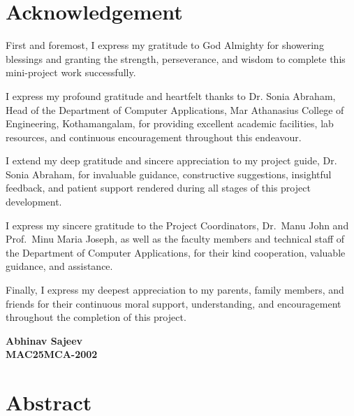 \documentclass[12pt,a4paper]{report}
\renewcommand{\headrulewidth}{0.4pt}
\renewcommand{\footrulewidth}{0.4pt}
\renewcommand{\headrulewidth}{0.4pt}
\renewcommand{\footrulewidth}{0.4pt}
\begin{document}
\pagestyle{fancy}
\fancyhf{}
\fancyfoot[C]{\thepage}
\renewcommand{\headrulewidth}{0pt}
\renewcommand{\footrulewidth}{0pt}

\fancypagestyle{plain}{
    \fancyhf{}
    \fancyfoot[C]{\thepage}
    \renewcommand{\headrulewidth}{0pt}
    \renewcommand{\footrulewidth}{0pt}
}

\chapter*{Acknowledgement}

First and foremost, I express my gratitude to God Almighty for showering blessings and granting the strength, perseverance, and wisdom to complete this mini-project work successfully.

I express my profound gratitude and heartfelt thanks to Dr. Sonia Abraham, Head of the Department of Computer Applications, Mar Athanasius College of Engineering, Kothamangalam, for providing excellent academic facilities, lab resources, and continuous encouragement throughout this endeavour.

I extend my deep gratitude and sincere appreciation to my project guide, Dr. Sonia Abraham, for invaluable guidance, constructive suggestions, insightful feedback, and patient support rendered during all stages of this project development.

I express my sincere gratitude to the Project Coordinators, Dr.~Manu John and Prof.~Minu Maria Joseph, as well as the faculty members and technical staff of the Department of Computer Applications, for their kind cooperation, valuable guidance, and assistance.

Finally, I express my deepest appreciation to my parents, family members, and friends for their continuous moral support, understanding, and encouragement throughout the completion of this project.

\vspace{1.5cm}
\begin{flushright}
\textbf{Abhinav Sajeev} \\
\textbf{MAC25MCA-2002}
\end{flushright}

\newpage
\chapter*{Abstract}
\end{document}
